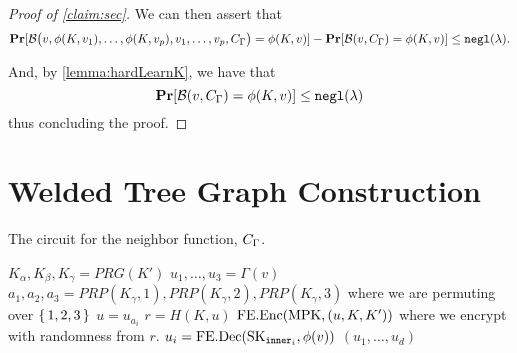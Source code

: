 \begin{proof}[Proof of \cref{claim:sec}]
We can then assert that
\begin{equation*}
		\operatorname*{\mathbf{Pr}}[\mathcal{B}\big(v, \phi(K, v_1), \dots, \phi(K, v_p), v_1, \dots, v_p, C_\Gamma\big) = \phi(K, v)]
			 - \operatorname*{\mathbf{Pr}}[\mathcal{B}(v, C_\Gamma) = \phi(K, v)]
	\leq \texttt{negl}(\lambda).
\end{equation*}


And, by \cref{lemma:hardLearnK}, we have that
\begin{equation*}
	\operatorname*{\mathbf{Pr}}[\mathcal{B}(v, C_\Gamma) = \phi(K, v)] \leq \texttt{negl}(\lambda)
\end{equation*}
thus concluding the proof.
\end{proof}

\section{Welded Tree Graph Construction}
\begin{algorithm}[H]
	\caption{
		The circuit for the neighbor function, $C_\Gamma$.
	}
	\begin{algorithmic}[1]
		 	\State $K_\alpha, K_\beta, K_\gamma = PRG(K')$
			\State $u_1, \dots, u_3 = \Gamma(v)$
			\State $a_1, a_2, a_3 = PRP(K_\gamma, 1), PRP(K_\gamma, 2), PRP(K_\gamma, 3)$ where we are permuting over $\set{1, 2, 3}$
			\State $u = u_{a_i}$
			\State $r = H(K, u)$
			\State \Return $\text{FE.Enc}(\text{MPK}, (u, K, K'))$ where we encrypt with randomness from $r$.
		\EndFunction
				\State $u_i = \text{FE.Dec}(\text{SK}_{\texttt{inner}_i}, \phi(v))$
			\EndFor
			\State \Return $(u_1, \dots, u_d)$
		\EndFunction
	\end{algorithmic}
\end{algorithm}



